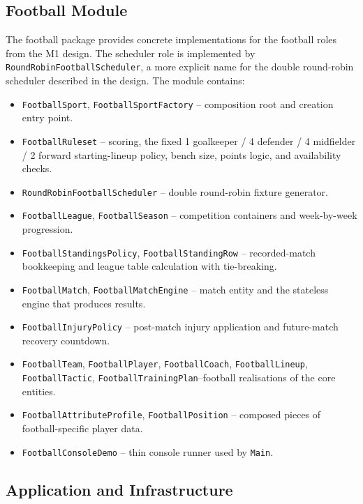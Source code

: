 \documentclass[11pt, a4paper]{article}
\newcommand{\code}[1]{\texttt{#1}}
\begin{document}
\subsection{Football Module}

The football package provides concrete implementations for the football
roles from the M1 design. The scheduler role is implemented by
\code{RoundRobinFootballScheduler}, a more explicit name for the double
round-robin scheduler described in the design. The module contains:

\begin{itemize}
    \item \code{FootballSport}, \code{FootballSportFactory} -- composition
          root and creation entry point.
    \item \code{FootballRuleset} -- scoring, the fixed 1 goalkeeper /
          4 defender / 4 midfielder / 2 forward starting-lineup policy,
          bench size, points logic, and availability checks.
    \item \code{RoundRobinFootballScheduler} -- double round-robin fixture
          generator.
    \item \code{FootballLeague}, \code{FootballSeason} -- competition
          containers and week-by-week progression.
    \item \code{FootballStandingsPolicy}, \code{FootballStandingRow} --
          recorded-match bookkeeping and league table calculation with
          tie-breaking.
    \item \code{FootballMatch}, \code{FootballMatchEngine} -- match entity
          and the stateless engine that produces results.
    \item \code{FootballInjuryPolicy} -- post-match injury application and
          future-match recovery countdown.
    \item \code{FootballTeam}, \code{FootballPlayer}, \code{FootballCoach},
          \code{FootballLineup}, 
          \code{FootballTactic}, \code{FootballTrainingPlan}--football realisations of the core entities.
    \item \code{FootballAttributeProfile}, \code{FootballPosition} --
          composed pieces of football-specific player data.
    \item \code{FootballConsoleDemo} -- thin console runner used by
          \code{Main}.
\end{itemize}

\subsection{Application and Infrastructure}
\end{document}
